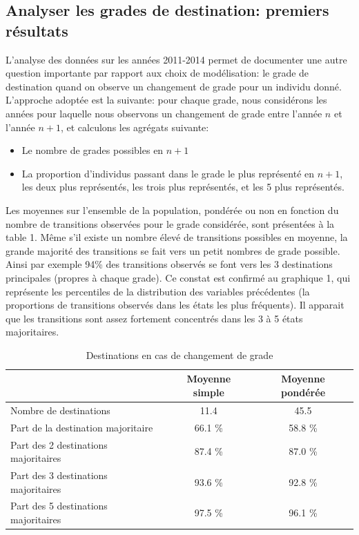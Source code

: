\documentclass[11pt,a4paper]{article}
\begin{document}
\subsection{Analyser les grades de destination: premiers résultats}

L'analyse des données sur les années 2011-2014 permet de documenter une autre question importante par rapport aux choix de modélisation:
le grade de destination quand on observe un changement de grade pour un individu donné. L'approche adoptée est la suivante: pour chaque grade, 
nous considérons les années pour laquelle nous observons un changement de grade entre l'année $n$ et l'année $n+1$, et calculons les agrégats suivante: 


\begin{itemize}[leftmargin=1cm ,parsep=0cm,itemsep=0cm,topsep=0cm] 
\item Le nombre de grades possibles en $n+1$
\item La proportion d'individus passant dans le grade le plus représenté en $n+1$, les deux plus représentés, les trois plus représentés, et les 5 plus représentés. 
\end{itemize}

Les moyennes sur l'ensemble de la population, pondérée ou non en fonction du nombre de transitions observées pour le grade considérée, sont présentées à la table 1. Même s'il existe un nombre élevé de transitions possibles en moyenne, la grande majorité des transitions se fait vers un petit nombres de grade possible. Ainsi par exemple 94\% des transitions observés se font vers les 3 destinations principales (propres à chaque grade). Ce constat est confirmé au graphique 1, qui représente les percentiles de la distribution des variables précédentes (la proportions de transitions observés dans les états les plus fréquents). Il apparait que les transitions sont assez fortement concentrés dans les 3 à 5 états majoritaires. 

\begin{table}[h!]
\label{means}
\centering
\caption{Destinations en cas de changement de grade} 
\begin{tabular}{l|cc}
  \hline
 & Moyenne simple & Moyenne pondérée \\ 
  \hline
Nombre de destinations & 11.4 & 45.5 \\ 
  Part de la destination majoritaire   & 66.1 \% & 58.8 \%  \\ 
  Part des 2 destinations majoritaires & 87.4 \% & 87.0 \% \\ 
  Part des 3 destinations majoritaires & 93.6 \% & 92.8 \% \\ 
  Part des 5 destinations majoritaires & 97.5 \% & 96.1 \% \\ 
   \hline
\end{tabular}
\end{table}
\end{document}
